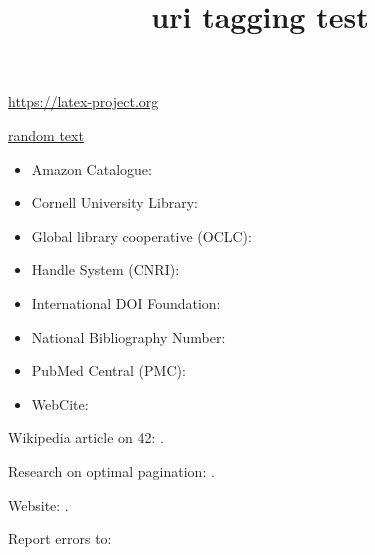 \documentclass{article}
\title{uri tagging test}
\begin{document}
\url{https://latex-project.org} %

\href{https://latex-project.org}{random text} %

\begin{itemize}
\item Amazon Catalogue:             \hfill {}
\item Cornell University Library:   \hfill {}
\item Global library cooperative (OCLC):   \hfill {}
\item Handle System (CNRI):         \hfill {}
\item International DOI Foundation: \hfill {}
\item National Bibliography Number: \hfill {}
\item PubMed Central (PMC):         \hfill {}
\item WebCite:                      \hfill {}
\end{itemize}



Wikipedia article on 42:        .

Research on optimal pagination: .

Website:          .

Report errors to: 
\end{document}
